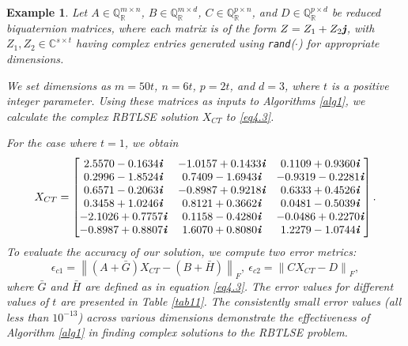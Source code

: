 \documentclass[preprint,11pt,3p]{elsarticle}
\newtheorem{example}[theorem]{Example}
\newcommand\norm[1]{\left\lVert#1\right\rVert}
\def \C{{\mathbb C}}
\def \QR{\mathbb{Q}_\mathbb{R}}
\def \i{\textit{\textbf{i}}}
\def \j{\textit{\textbf{j}}}
\begin{document}
\begin{example} \label{ex1}
Let \( A \in \QR^{m \times n} \), \( B \in \QR^{m \times d} \), \( C \in \QR^{p \times n} \), and \( D \in \QR^{p \times d} \) be reduced biquaternion matrices, where each matrix is of the form \( Z = Z_1 + Z_2\j \), with \( Z_1, Z_2 \in \C^{s \times t} \) having complex entries generated using \texttt{rand}(\(\cdot\)) for appropriate dimensions.

We set dimensions as $m=50t$, $n=6t$, $p=2t$, and $d=3$, where $t$ is a positive integer parameter. Using these matrices as inputs to Algorithms \ref{alg1}, we calculate the complex RBTLSE solution $X_{CT}$ to \eqref{eq4.3}.

For the case where $t=1$, we obtain
	\begin{equation*}
	X_{CT} = \begin{bmatrix}
		2.5570-0.1634 \i & -1.0157+0.1433\i & 0.1109+0.9360\i \\
		0.2996-1.8524\i & 0.7409-1.6943\i & -0.9319-0.2281\i \\
		0.6571-0.2063\i & -0.8987+0.9218\i & 0.6333+0.4526\i \\
		0.3458+1.0246\i & 0.8121+0.3662\i & 0.0481-0.5039\i \\
		-2.1026+0.7757\i & 0.1158-0.4280\i & -0.0486+0.2270\i \\
		-0.8987+0.8807\i & 1.6070+0.8080\i & 1.2279-1.0744\i
	\end{bmatrix}.
\end{equation*}
To evaluate the accuracy of our solution, we compute two error metrics:	
\begin{equation*}
\epsilon_{c1}=\norm{(A+\bar{G})X_{CT}-(B+\bar{H})}_F, ~ \epsilon_{c2}=\norm{CX_{CT}-D}_F,
\end{equation*}
	where $\bar{G}$ and $\bar{H}$ are defined as in equation \eqref{eq4.3}. The error values for different values of $t$ are presented in Table \ref{tab11}.  The consistently small error values (all less than $10^{-13}$) across various dimensions demonstrate the effectiveness of Algorithm \ref{alg1} in finding complex solutions to the RBTLSE problem.
\end{example}
\end{document}

